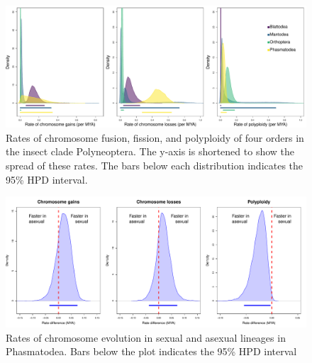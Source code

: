 \documentclass[]{rsos}%
\begin{document}
\begin{figure}[h!]
\centering \includegraphics[width=1\textwidth]{order_rates_95HPD.pdf}
\caption{Rates of chromosome fusion, fission, and polyploidy of four orders in the insect clade Polyneoptera. 
The y-axis is shortened to show the spread of these rates. 
The bars below each distribution indicates the 95\% HPD interval.}
\label{fig:order.rates.95HPD}
\end{figure}


\begin{figure}[h!]
\centering \includegraphics[width=1\textwidth]{phas_plot.pdf}
\caption{Rates of chromosome evolution in sexual and asexual lineages in Phasmatodea. 
Bars below the plot indicates the 95\% HPD interval}
\label{fig:phas.plot}
\end{figure}
\end{document}
